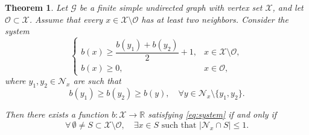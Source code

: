 \documentclass[reqno,11pt]{amsart}
\numberwithin{equation}{section}
\newtheorem{theorem}{Theorem}[section]
\theoremstyle{definition}
\theoremstyle{remark}
\begin{document}
\begin{theorem}\label{thm:plucking-condition}
Let \(\mathcal G\) be a finite simple undirected graph with vertex
set \(\mathcal X\), and let \(\mathcal O\subset\mathcal X\). Assume
that every \(x\in\mathcal X\setminus\mathcal O\) has at least two
neighbors. Consider the system
\begin{equation}\label{eq:system}
\begin{cases}
b(x)\ge \dfrac{b(y_1)+b(y_2)}{2}+1, & x\in \mathcal{X}\setminus \mathcal{O},\\[1ex]
b(x)\ge 0, & x\in \mathcal{O},
\end{cases}
\end{equation}
where $y_1,y_2\in\mathcal N_x$ are such that
$$b(y_1)\ge b(y_2)\ge b(y),\quad \forall y\in\mathcal{N}_x\setminus\{y_1,y_2\}.$$

Then there exists a function $b:\mathcal{X}\to\mathbb{R}$ satisfying
\eqref{eq:system} if and only if
\begin{equation}\label{eq:plucking-condition}
    \boxed{
    \forall\,\emptyset\neq S\subset \mathcal{X}\setminus \mathcal{O},
    \quad
    \exists x\in S \text{ such that }
    |\mathcal{N}_x\cap S|\le 1 .
    }
\end{equation}
\end{theorem}
\end{document}
